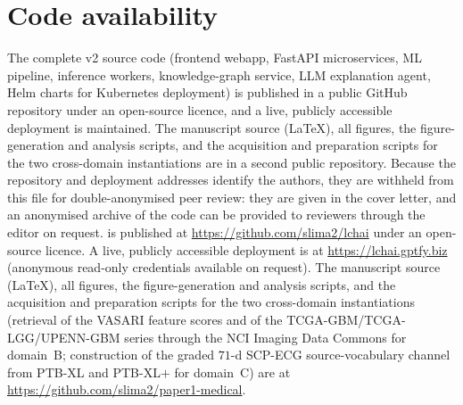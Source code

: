 \section*{Code availability}
The complete \lchai{} v2 source code (frontend webapp, FastAPI
microservices, ML pipeline, inference workers, knowledge-graph
service, LLM explanation agent, Helm charts for Kubernetes deployment)
\ifanon
is published in a public GitHub repository under an open-source
licence, and a live, publicly accessible deployment is maintained.
The manuscript source (LaTeX), all figures, the figure-generation and
analysis scripts, and the acquisition and preparation scripts for the
two cross-domain instantiations are in a second public repository.
Because the repository and deployment addresses identify the authors,
they are withheld from this file for double-anonymised peer review:
they are given in the cover letter, and an anonymised archive of the
code can be provided to reviewers through the editor on request.
\else
is published at \url{https://github.com/slima2/lchai} under an
open-source licence. A live, publicly accessible deployment is at
\url{https://lchai.gptfy.biz} (anonymous read-only credentials
available on request).
The manuscript source (LaTeX), all figures, the figure-generation and
analysis scripts, and the acquisition and preparation scripts for the
two cross-domain instantiations (retrieval of the VASARI feature scores
and of the TCGA-GBM/TCGA-LGG/UPENN-GBM series through the NCI Imaging
Data Commons for domain~B; construction of the graded $71$-d SCP-ECG
source-vocabulary channel from PTB-XL and PTB-XL$+$ for domain~C) are
at \url{https://github.com/slima2/paper1-medical}.
\fi
